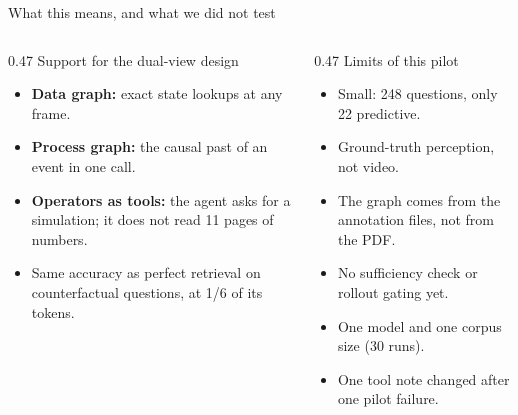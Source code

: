 \documentclass[aspectratio=169,11pt]{beamer}
\newcommand{\lbl}[1]{{\color{Mute}\fontsize{9.5}{12}\selectfont #1}\par}
\begin{document}
\begin{frame}{What this means, and what we did not test}
  \vspace{0.25cm}
  \begin{columns}[T,onlytextwidth]
    \begin{column}{0.47\textwidth}
      \lbl{Support for the dual-view design}
      {\fontsize{10}{13}\selectfont
      \begin{itemize}\setlength{\itemsep}{2pt}
        \item \textbf{Data graph:} exact state lookups at any frame.
        \item \textbf{Process graph:} the causal past of an event in one call.
        \item \textbf{Operators as tools:} the agent asks for a simulation; it does not read 11 pages of numbers.
        \item Same accuracy as perfect retrieval on counterfactual questions, at 1/6 of its tokens.
      \end{itemize}}
    \end{column}
    \begin{column}{0.47\textwidth}
      \lbl{Limits of this pilot}
      {\fontsize{10}{13}\selectfont
      \begin{itemize}\setlength{\itemsep}{2pt}
        \item Small: 248 questions, only 22 predictive.
        \item Ground-truth perception, not video.
        \item The graph comes from the annotation files, not from the PDF.
        \item No sufficiency check or rollout gating yet.
        \item One model and one corpus size (30 runs).
        \item One tool note changed after one pilot failure.
      \end{itemize}}
    \end{column}
  \end{columns}
\end{frame}
\end{document}
